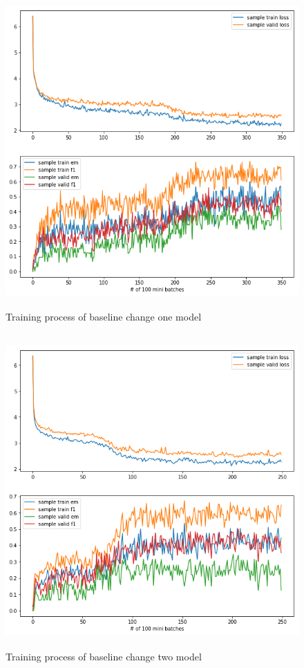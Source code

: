 \documentclass[modernstyle,12pt]{sjsuthesis}
\theoremstyle{definition}
\begin{document}
\begin{figure}[htbp]\centering
  \includegraphics[width=12cm, height=12cm]{figures/match_change1.png}
  \caption{Training process of baseline change one model}
  \label{f:baseline_change1}
\end{figure}

\begin{figure}[htbp]\centering
  \includegraphics[width=12cm, height=12cm]{figures/match_change2.png}
  \caption{Training process of baseline change two model}
  \label{f:baseline_change2}
\end{figure}
\end{document}
